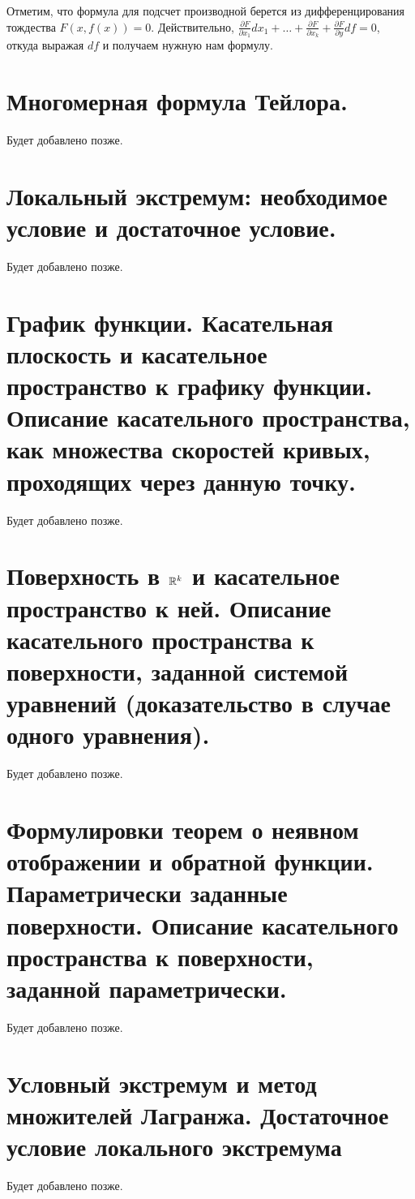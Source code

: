 \documentclass[a4paper]{article}
\theoremstyle{named}
\begin{document}
    \begin{remark*}
        Отметим, что формула для подсчет производной берется из дифференцирования тождества
        $F(x,f(x))=0$. Действительно, $\frac{\partial F}{\partial x_1}dx_1 + \ldots + \frac{\partial F}{\partial x_k}+\frac{\partial F}{\partial y}df=0$, откуда выражая $df$ и получаем нужную нам формулу.
    \end{remark*}

    \section{Многомерная формула Тейлора.} 
    
        Будет добавлено позже.

    \section{Локальный экстремум: необходимое условие и достаточное условие.} 
    
        Будет добавлено позже.

    \section{График функции. Касательная плоскость и касательное пространство к графику функции. Описание касательного пространства, как множества скоростей кривых, проходящих через данную точку.} 
    
        Будет добавлено позже.

    \section{Поверхность в $\mathbb{R}^k$ и касательное пространство к ней. Описание касательного пространства к поверхности, заданной системой уравнений (доказательство в случае одного уравнения).} 
    
        Будет добавлено позже.

    \section{Формулировки теорем о неявном отображении и обратной функции. Параметрически заданные поверхности. Описание касательного пространства к поверхности, заданной параметрически.} 
    
        Будет добавлено позже.

    \section{Условный экстремум и метод множителей Лагранжа. Достаточное условие локального экстремума}

        Будет добавлено позже.
\end{document}
